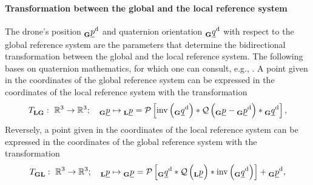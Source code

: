 \paragraph*{Transformation between the global and the local reference system} $\ $\\
The drone's position
$\pos[]{\drone}{}{\grs}{}$
and quaternion orientation
$\quat[]{\drone}{}{\grs}{}$
with respect to the global reference system
are the parameters that determine the bidirectional transformation
between the global and the local reference system.
The following bases on quaternion mathematics,
for which one can consult, e.g., \cite{Parent}.
A point given in the coordinates of the global reference system
can be expressed in the coordinates of the local reference system
with the transformation
\begin{align} \label{equ:global_to_local_transformation}
    \trafo[]{}{\lrs\grs}{}{}
    :\ 
    \mathbb{R}^3 \rightarrow \mathbb{R}^3
    ; \quad
    \pos[]{}{}{\grs}{} \mapsto \pos[]{}{}{\lrs}{}
    =
        \mathcal{P} \left[
            \mathrm{inv} \left( \quat[]{\drone}{}{\grs}{} \right)
            *
            \mathcal{Q} \left( \pos[]{}{}{\grs}{} - \pos[]{\drone}{}{\grs}{} \right)
            *
            \quat[]{\drone}{}{\grs}{}
        \right], 
\end{align}
Reversely, a point given in the coordinates of the local reference system
can be expressed in the coordinates of the global reference system
with the transformation
\begin{align} \label{eq:local_to_global_transformation}
    \trafo[]{}{\grs\lrs}{}{}
    :\ 
    \mathbb{R}^3 \rightarrow \mathbb{R}^3
    ; \quad
    \pos[]{}{}{\lrs}{} \mapsto \pos[]{}{}{\grs}{}
    =
        \mathcal{P} \left[
            \quat[]{\drone}{}{\grs}{}
            *
            \mathcal{Q} \left( \pos[]{}{}{\lrs}{} \right)
            *
            \mathrm{inv} \left( \quat[]{\drone}{}{\grs}{} \right)
        \right] + \pos[]{\drone}{}{\grs}{}, 
\end{align}
